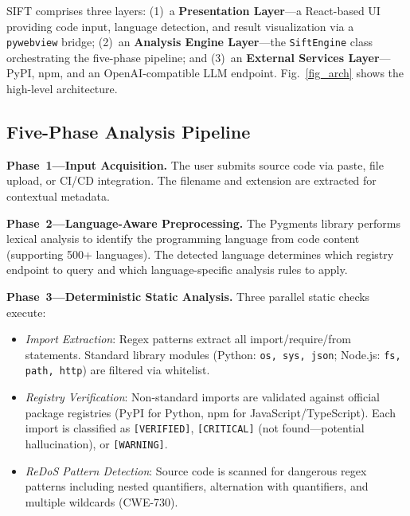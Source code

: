 \documentclass[conference]{IEEEtran}
\begin{document}
SIFT comprises three layers: (1)~a \textbf{Presentation Layer}---a React-based UI providing code input, language detection, and result visualization via a \texttt{pywebview} bridge; (2)~an \textbf{Analysis Engine Layer}---the \texttt{SiftEngine} class orchestrating the five-phase pipeline; and (3)~an \textbf{External Services Layer}---PyPI, npm, and an OpenAI-compatible LLM endpoint. Fig.~\ref{fig_arch} shows the high-level architecture.


\subsection{Five-Phase Analysis Pipeline}

\textbf{Phase~1---Input Acquisition.} The user submits source code via paste, file upload, or CI/CD integration. The filename and extension are extracted for contextual metadata.

\textbf{Phase~2---Language-Aware Preprocessing.} The Pygments library performs lexical analysis to identify the programming language from code content (supporting 500+ languages). The detected language determines which registry endpoint to query and which language-specific analysis rules to apply.

\textbf{Phase~3---Deterministic Static Analysis.} Three parallel static checks execute:

\begin{itemize}
\item \textit{Import Extraction}: Regex patterns extract all import/require/from statements. Standard library modules (Python: \texttt{os, sys, json}; Node.js: \texttt{fs, path, http}) are filtered via whitelist.
\item \textit{Registry Verification}: Non-standard imports are validated against official package registries (PyPI for Python, npm for JavaScript/TypeScript). Each import is classified as \texttt{[VERIFIED]}, \texttt{[CRITICAL]} (not found---potential hallucination), or \texttt{[WARNING]}.
\item \textit{ReDoS Pattern Detection}: Source code is scanned for dangerous regex patterns including nested quantifiers, alternation with quantifiers, and multiple wildcards (CWE-730).
\end{itemize}
\end{document}
